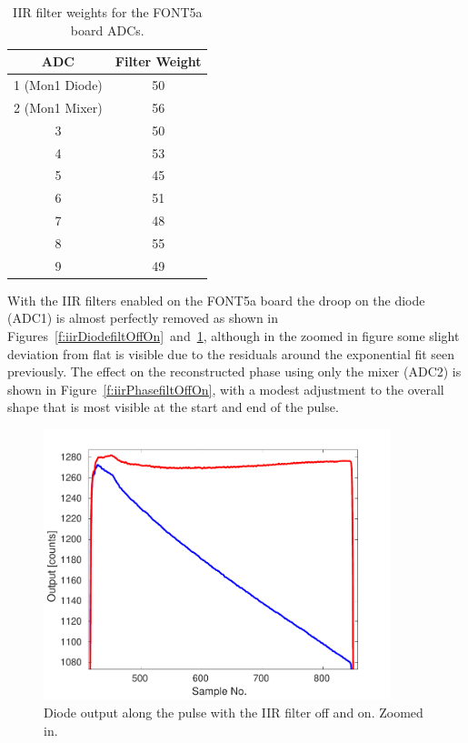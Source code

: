 \begin{table}
  \begin{center}
    \begin{tabular}{| c | c |}
	   \hline
       ADC & Filter Weight \\ \hline
       1 (Mon1 Diode) & 50 \\
	   2 (Mon1 Mixer) & 56 \\
	   3 & 50 \\
	   4 & 53 \\
	   5 & 45 \\
	   6 & 51 \\
	   7 & 48 \\
	   8 & 55 \\
	   9 & 49 \\
 	   \hline
    \end{tabular}
    \caption{IIR filter weights for the FONT5a board ADCs.}
  	\label{t:filtWeights}
  \end{center}
\end{table}

With the IIR filters enabled on the FONT5a board the droop on the diode (ADC1) is almost perfectly removed as shown in Figures~\ref{f:iirDiodefiltOffOn}~and~\ref{f:iirDiodefiltOffOn_zoom}, although in the zoomed in figure some slight deviation from flat is visible due to the residuals around the exponential fit seen previously. The effect on the reconstructed phase using only the mixer (ADC2) is shown in Figure~\ref{f:iirPhasefiltOffOn}, with a modest adjustment to the overall shape that is most visible at the start and end of the pulse.

\begin{figure}
  \centering
  \includegraphics[width=0.9\textwidth]{Figures/commissioning/iirDiodeFiltOffOn_zoom}
  \caption{Diode output along the pulse with the IIR filter off and on. Zoomed in.}
  \label{f:iirDiodefiltOffOn_zoom}
\end{figure}

